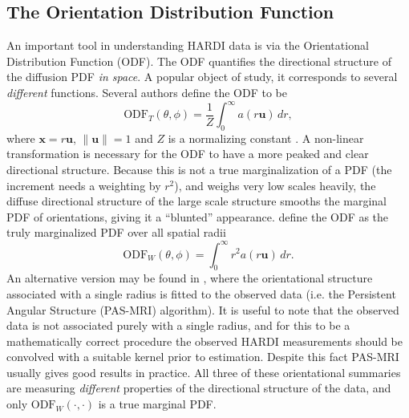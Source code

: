 \documentclass[dvips,aoas,preprint]{imsart}
\numberwithin{equation}{section}
\theoremstyle{plain}
\newcommand{\uu}{\mathbf{u}}
\newcommand{\x}{\mathbf{x}}
\begin{document}
\subsection{The Orientation Distribution Function}

An important tool in understanding HARDI data is via the Orientational
Distribution Function (ODF).  The ODF quantifies the directional
structure of the diffusion PDF {\em in space}.  A popular object of
study, it corresponds to several {\em different} functions.
Several authors  define the ODF to be
\begin{equation}
  \text{ODF}_T(\theta,\phi) = \frac{1}{Z} \int_0^{\infty} a(r\uu)\,dr,
\end{equation}
where $\x=r\uu$, $\|\uu\|=1$ and $Z$ is a normalizing constant
\citep{Tuch,Hess,Descoteaux}.  A non-linear transformation is necessary
for the ODF to have a more peaked and clear directional structure.
Because this is not a true marginalization of a PDF (the increment
needs a weighting by $r^2$), and weighs very low scales heavily, the
diffuse directional structure of the large scale structure smooths the
marginal PDF of orientations, giving it a ``blunted'' appearance.
\citet{Wedeen05} define the ODF as the truly marginalized PDF over all
spatial radii
\[\text{ODF}_W(\theta,\phi)=\int_0^{\infty}r^2a(r\uu)\,dr.\]  An
alternative version may be found in \citet{Jansons}, where the
orientational structure associated with a single radius is fitted to
the observed data (i.e. the Persistent Angular Structure (PAS-MRI)
algorithm).  It is useful to note that the observed data is not
associated purely with a single radius, and for this to be a
mathematically correct procedure the observed HARDI measurements
should be convolved with a suitable kernel prior to estimation.
Despite this fact PAS-MRI usually gives good results in practice.  All
three of these orientational summaries are measuring {\em different}
properties of the directional structure of the data, and only
$\text{ODF}_W(\cdot,\cdot)$ is a true marginal PDF.
\end{document}
